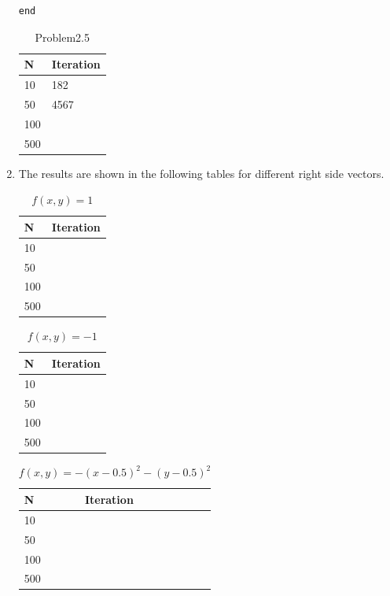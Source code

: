 \documentclass{article}
\begin{document}
\begin{enumerate}
\begin{lstlisting}
end
\end{lstlisting} 

\begin{table}[!htbp]
\centering
\caption{Problem2.5}
\label{my-label}
\begin{tabular}{|l|l|}
\hline
N   & Iteration \\ \hline
10  & 182       \\ \hline
50  &   4567        \\ \hline
100 &           \\ \hline
500 &           \\ \hline
\end{tabular}
\end{table}

\item 
The results are shown in the following tables for different right side vectors. \\
\begin{table}[!htbp]
\centering
\caption{$f(x, y)=1$ }
\label{my-label}
\begin{tabular}{|l|l|}
\hline
N   & Iteration \\ \hline
10  &        \\ \hline
50  &           \\ \hline
100 &           \\ \hline
500 &           \\ \hline
\end{tabular}
\end{table}

\begin{table}[!htbp]
\centering
\caption{$f(x, y)=-1$ }
\label{my-label}
\begin{tabular}{|l|l|}
\hline
N   & Iteration \\ \hline
10  &        \\ \hline
50  &           \\ \hline
100 &           \\ \hline
500 &           \\ \hline
\end{tabular}
\end{table}

\begin{table}[!htbp]
\centering
\caption{$f(x, y)=-(x-0.5)^2-(y-0.5)^2$ }
\label{my-label}
\begin{tabular}{|l|l|}
\hline
N   & Iteration \\ \hline
10  &        \\ \hline
50  &           \\ \hline
100 &           \\ \hline
500 &           \\ \hline
\end{tabular}
\end{table}


\end{enumerate}
\end{document}
